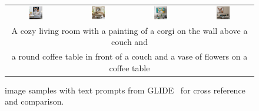 \begin{figure}[ht!]
\begin{tabular}{cccc}
        \includegraphics[width=0.24\textwidth]{figures/cross/livingroom_0.jpg} &
        \includegraphics[width=0.24\textwidth]{figures/cross/livingroom_1.jpg} &
        \includegraphics[width=0.24\textwidth]{figures/cross/livingroom_2.jpg} &
        \includegraphics[width=0.24\textwidth]{figures/cross/livingroom_3.jpg} \vspace{-1mm}\\
        \multicolumn{4}{c}{\small A cozy living room with a painting of a corgi on the wall above a couch and } \\
        \multicolumn{4}{c}{\small a round coffee table in front of a couch and a vase of flowers on a coffee table}\\
    \end{tabular} 
    \caption{\bdraw image samples with text prompts from GLIDE~\cite{nichol2021glide}  for cross reference and comparison.}
    \label{figs:cross_reference_2}
    \vskip -0.2in
\end{figure}